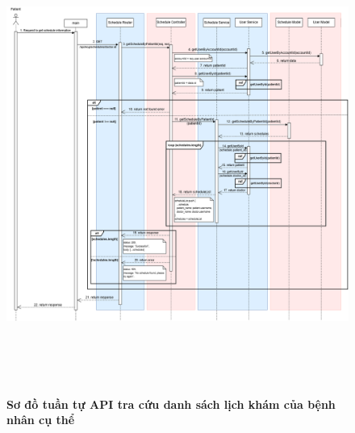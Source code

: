\begin{figure}[H]
	\centering
	\includegraphics[width=15cm,height=15cm]{Images/api_sequence/schedule/getScheduleByPatientId.drawio.png}
	\caption[Sơ đồ tuần tự API tra cứu danh sách lịch khám của bệnh nhân cụ thể]{\bfseries \fontsize{12pt}{0pt}\selectfont Sơ đồ tuần tự API tra cứu danh sách lịch khám của bệnh nhân cụ thể}
	\label{sequence_diagram_get_schedule_by_patient}
\end{figure}

